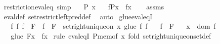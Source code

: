 \begin{isabellebody}
%
\isadelimproof
\isanewline
%
\endisadelimproof
\isanewline
{}\isamarkupfalse%
\ restriction{\isacharunderscore}{\kern0pt}eval{\isacharunderscore}{\kern0pt}eq\ {\isacharbrackleft}{\kern0pt}simp{\isacharbrackright}{\kern0pt}{\isacharcolon}{\kern0pt}\isanewline
\ \ \ {\isachardoublequoteopen}P\ x{\isachardoublequoteclose}\isanewline
\ \ \ {\isachardoublequoteopen}{\isacharparenleft}{\kern0pt}f{\isasymrestriction}\isactrlbsub P\isactrlesub {\isacharparenright}{\kern0pt}{\isacharbackquote}{\kern0pt}x\ {\isacharequal}{\kern0pt}\ f{\isacharbackquote}{\kern0pt}x{\isachardoublequoteclose}\isanewline
%
\isadelimproof
\ \ %
\endisadelimproof
%
\isatagproof
{}\isamarkupfalse%
\ assms\ \isamarkupfalse%
\ eval{\isacharunderscore}{\kern0pt}def\ set{\isacharunderscore}{\kern0pt}restrict{\isacharunderscore}{\kern0pt}left{\isacharunderscore}{\kern0pt}pred{\isacharunderscore}{\kern0pt}def\ \isamarkupfalse%
\ auto%
\endisatagproof
{\isafoldproof}%
%
\isadelimproof
\isanewline
%
\endisadelimproof
\isanewline
{}\isamarkupfalse%
\ glue{\isacharunderscore}{\kern0pt}eval{\isacharunderscore}{\kern0pt}eqI{\isacharcolon}{\kern0pt}\isanewline
\ \ \ {\isachardoublequoteopen}{\isasymAnd}f\ f{\isacharprime}{\kern0pt}{\isachardot}{\kern0pt}\ f\ {\isasymin}\ F\ {\isasymLongrightarrow}\ f{\isacharprime}{\kern0pt}\ {\isasymin}\ F\ {\isasymLongrightarrow}\ set{\isacharunderscore}{\kern0pt}right{\isacharunderscore}{\kern0pt}unique{\isacharunderscore}{\kern0pt}on\ {\isacharbraceleft}{\kern0pt}x{\isacharbraceright}{\kern0pt}\ {\isacharparenleft}{\kern0pt}glue\ {\isacharbraceleft}{\kern0pt}f{\isacharcomma}{\kern0pt}\ f{\isacharprime}{\kern0pt}{\isacharbraceright}{\kern0pt}{\isacharparenright}{\kern0pt}{\isachardoublequoteclose}\isanewline
\ \ \ {\isachardoublequoteopen}f\ {\isasymin}\ F{\isachardoublequoteclose}\isanewline
\ \ \ {\isachardoublequoteopen}x\ {\isasymin}\ dom\ f{\isachardoublequoteclose}\isanewline
\ \ \ {\isachardoublequoteopen}{\isacharparenleft}{\kern0pt}glue\ F{\isacharparenright}{\kern0pt}{\isacharbackquote}{\kern0pt}x\ {\isacharequal}{\kern0pt}\ f{\isacharbackquote}{\kern0pt}x{\isachardoublequoteclose}\isanewline
%
\isadelimproof
%
\endisadelimproof
%
\isatagproof
{}\isamarkupfalse%
\ {\isacharparenleft}{\kern0pt}rule\ eval{\isacharunderscore}{\kern0pt}eqI{\isacharbrackleft}{\kern0pt}\ {\isacharquery}{\kern0pt}P{\isacharequal}{\kern0pt}{\isachardoublequoteopen}mem{\isacharunderscore}{\kern0pt}of\ {\isacharbraceleft}{\kern0pt}x{\isacharbraceright}{\kern0pt}{\isachardoublequoteclose}{\isacharbrackright}{\kern0pt}{\isacharcomma}{\kern0pt}\ fold\ set{\isacharunderscore}{\kern0pt}right{\isacharunderscore}{\kern0pt}unique{\isacharunderscore}{\kern0pt}on{\isacharunderscore}{\kern0pt}set{\isacharunderscore}{\kern0pt}def{\isacharparenright}{\kern0pt}\isanewline

\end{isabellebody}
